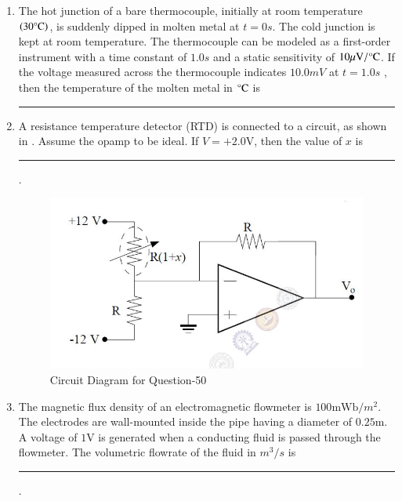 \documentclass[journal,12pt,onecolumn]{IEEEtran}
\theoremstyle{remark}
\begin{document}
\begin{enumerate}
\item The hot junction of a bare thermocouple, initially at room temperature $\left(30\degree\text{C}\right)$, is suddenly
dipped in molten metal at $t = 0s$. The cold junction is kept at room temperature. The
thermocouple can be modeled as a first-order instrument with a time constant of $1.0 s$ and a
static sensitivity of $10{\mu}\text{V}/{\degree}\text{C}$. If the voltage measured across the thermocouple indicates
$10.0 mV$ at $t = 1.0s$ , then the temperature of the molten metal in ${\degree}\text{C}$ is \rule{1.5cm}{0.4pt} \par \hfill{}

\item A resistance temperature detector (RTD) is connected to a circuit, as shown in .
Assume the opamp to be ideal. If $V = +2.0\text{V}$, then the value of $x$ is \rule{1.5cm}{0.4pt}. \par \hfill{}
\begin{figure}[H]
    \centering
    \includegraphics[width=0.6\columnwidth]{Figs/Q-50.png}
    \caption{Circuit Diagram for Question-50}
    \label{f-24}
\end{figure}


\item The magnetic flux density of an electromagnetic flowmeter is $100 \text{mWb}/{m}^2$. The electrodes are wall-mounted inside the pipe having a diameter of $0.25\text{m}$. A voltage of $1 \text{V}$ is generated when a conducting fluid is passed through the flowmeter. The volumetric flowrate of the fluid in $m^3/s$ is \rule{1.5cm}{0.4pt}. \par \hfill{}


\end{enumerate}
\end{document}
